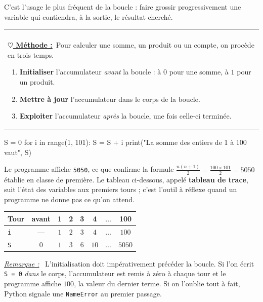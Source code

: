 \documentclass[a4paper,11pt,openany]{book}
\makeatletter
\newcommand{\mot}[1]{\textcolor{rougecours}{\textbf{#1}}}
\newcommand{\code}[1]{\texttt{\textcolor{codebleu}{#1}}}
\newenvironment{cadre}%
 {\par\vspace{2mm}\noindent\begin{tabular}{|@{\hspace{4mm}}p{0.93\textwidth}@{\hspace{4mm}}|}
  \hline \\[-2mm]}%
 {\\[2mm] \hline \end{tabular}\par\vspace{3mm}}
\newcommand{\methode}{\textbf{\underline{$\heartsuit$ Méthode :}}~}
\newenvironment{remarque}%
 {\par\vspace{1mm}\begin{list}{}{\leftmargin=1cm \rightmargin=0.5cm}\item[]%
  \textit{\underline{Remarque :}}~}%
 {\end{list}\vspace{1mm}}
\renewcommand{\arraystretch}{1.4}
\makeatother
\begin{document}
C'est l'usage le plus fréquent de la boucle : faire grossir progressivement une variable qui contiendra, à la sortie, le résultat cherché.

\begin{cadre}
\methode Pour calculer une somme, un produit ou un compte, on procède en trois temps.
\begin{enumerate}[leftmargin=8mm,itemsep=0.5mm,topsep=1mm]
\item \textbf{Initialiser} l'accumulateur \emph{avant} la boucle : à $0$ pour une somme, à $1$ pour un produit.
\item \textbf{Mettre à jour} l'accumulateur dans le corps de la boucle.
\item \textbf{Exploiter} l'accumulateur \emph{après} la boucle, une fois celle-ci terminée.
\end{enumerate}
\end{cadre}

\begin{python}
S = 0
for i in range(1, 101):
    S = S + i
print("La somme des entiers de 1 à 100 vaut", S)
\end{python}

Le programme affiche \code{5050}, ce que confirme la formule $\frac{n(n+1)}{2} = \frac{100 \times 101}{2} = 5050$ établie en classe de première. Le tableau ci-dessous, appelé \mot{tableau de trace}, suit l'état des variables aux premiers tours ; c'est l'outil à réflexe quand un programme ne donne pas ce qu'on attend.

\begin{center}
\renewcommand{\arraystretch}{1.4}
\begin{tabular}{|l|c|c|c|c|c|c|c|}
\hline
\rowcolor{orange!50} \textbf{Tour} & avant & 1\up{er} & 2\up{e} & 3\up{e} & 4\up{e} & $\dots$ & 100\up{e} \\
\hline
\code{i} & --- & $1$ & $2$ & $3$ & $4$ & $\dots$ & $100$ \\
\hline
\code{S} & $0$ & $1$ & $3$ & $6$ & $10$ & $\dots$ & $5050$ \\
\hline
\end{tabular}
\end{center}

\begin{remarque}
L'initialisation doit impérativement précéder la boucle. Si l'on écrit \code{S = 0} \emph{dans} le corps, l'accumulateur est remis à zéro à chaque tour et le programme affiche $100$, la valeur du dernier terme. Si on l'oublie tout à fait, Python signale une \code{NameError} au premier passage.
\end{remarque}
\end{document}

